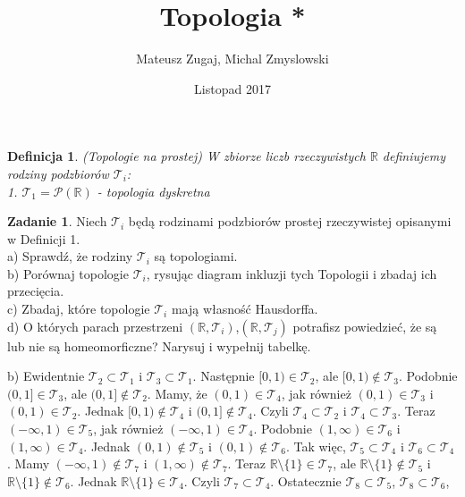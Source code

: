 \documentclass{article}
\title{Topologia *}
\author{Mateusz Zugaj, Michal Zmyslowski}
\date{Listopad 2017}
\theoremstyle{plain}%
\newtheorem{defn}{Definicja}
\theoremstyle{definition}
\newtheorem{zad}{Zadanie}
\begin{document}
	
	\maketitle
	
	\begin{defn}
		(Topologie na prostej) W zbiorze liczb rzeczywistych $\mathbb{R}$ definiujemy rodziny podzbiorów $\mathcal{T}_{i}$:\\
		1. $\mathcal{T}_{1}=\mathcal{P}(\mathbb{R})$ - topologia dyskretna
	\end{defn}
	
	\begin{zad}
		Niech $\mathcal{T}_{i}$ będą rodzinami podzbiorów prostej rzeczywistej opisanymi w Definicji 1.\\
		a) Sprawdź, że rodziny $\mathcal{T}_{i}$ są topologiami.\\
		b) Porównaj topologie $\mathcal{T}_{i}$, rysując diagram inkluzji tych Topologii i zbadaj ich przecięcia.\\
		c) Zbadaj, które topologie $\mathcal{T}_{i}$ mają własność Hausdorffa.\\
		d) O których parach przestrzeni $(\mathbb{R},\mathcal{T}_{i})$,$(\mathbb{R},\mathcal{T}_{j})$ potrafisz powiedzieć, że są lub nie są homeomorficzne? Narysuj i wypełnij tabelkę.
	\end{zad}
	b) Ewidentnie $\mathcal{T}_{2}\subset\mathcal{T}_{1}$ i $\mathcal{T}_{3}\subset\mathcal{T}_{1}$. Następnie $[0,1)\in\mathcal{T}_{2}$, ale $[0,1)\not\in\mathcal{T}_{3}$. Podobnie $(0,1]\in\mathcal{T}_{3}$, ale $(0,1]\not\in\mathcal{T}_{2}$. Mamy, że $(0,1)\in\mathcal{T}_{4}$, jak również $(0,1)\in\mathcal{T}_{3}$ i $(0,1)\in\mathcal{T}_{2}$. Jednak $[0,1)\not\in\mathcal{T}_{4}$ i $(0,1]\not\in\mathcal{T}_{4}$. Czyli $\mathcal{T}_{4}\subset\mathcal{T}_{2}$ i $\mathcal{T}_{4}\subset\mathcal{T}_{3}$. Teraz $(-\infty,1)\in\mathcal{T}_{5}$, jak również $(-\infty,1)\in\mathcal{T}_{4}$. Podobnie $(1, \infty)\in\mathcal{T}_{6}$ i $(1, \infty)\in\mathcal{T}_{4}$. Jednak $(0,1)\not\in\mathcal{T}_{5}$ i $(0,1)\not\in\mathcal{T}_{6}$. Tak więc, $\mathcal{T}_{5}\subset\mathcal{T}_{4}$ i $\mathcal{T}_{6}\subset\mathcal{T}_{4}$. Mamy $(-\infty,1)\not\in\mathcal{T}_{7}$ i $(1, \infty)\not\in\mathcal{T}_{7}$. Teraz $\mathbb{R}\setminus\{1\}\in\mathcal{T}_{7}$, ale $\mathbb{R}\setminus\{1\}\not\in\mathcal{T}_{5}$ i $\mathbb{R}\setminus\{1\}\not\in\mathcal{T}_{6}$. Jednak $\mathbb{R}\setminus\{1\}\in\mathcal{T}_{4}$. Czyli $\mathcal{T}_{7}\subset\mathcal{T}_{4}$. Ostatecznie $\mathcal{T}_{8}\subset\mathcal{T}_{5}$, $\mathcal{T}_{8}\subset\mathcal{T}_{6}$,
\end{document}
